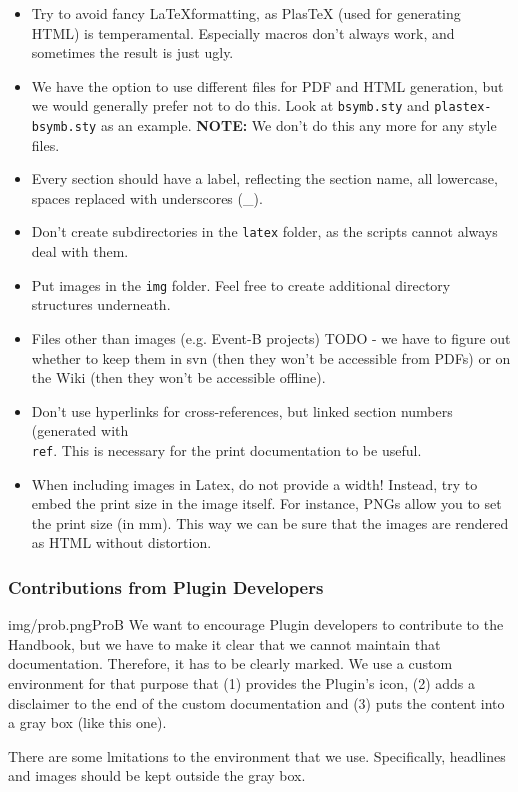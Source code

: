 \begin{itemize}
	\item Try to avoid fancy \LaTeX formatting, as PlasTeX (used for generating HTML) is temperamental.  Especially macros don't always work, and sometimes the result is just ugly.
	\item We have the option to use different files for PDF and HTML generation, but we would generally prefer not to do this.  Look at \texttt{bsymb.sty} and \texttt{plastex-bsymb.sty} as an example. \textbf{NOTE:} We don't do this any more for any style files.
	\item Every section should have a label, reflecting the section name, all lowercase, spaces replaced with underscores (\_).
	\item Don't create subdirectories in the \texttt{latex} folder, as the scripts cannot always deal with them.
	\item Put images in the \texttt{img} folder.  Feel free to create additional directory structures underneath.
	\item Files other than images (e.g. Event-B projects) TODO - we have to figure out whether to keep them in svn (then they won't be accessible from PDFs) or on the Wiki (then they won't be accessible offline).
	\item Don't use hyperlinks for cross-references, but linked section numbers (generated with \texttt{\\ref{}}.  This is necessary for the print documentation to be useful.
	\item When including images in Latex, do not provide a width!  Instead, try to embed the print size in the image itself.  For instance, PNGs allow you to set the print size (in mm).  This way we can be sure that the images are rendered as HTML without distortion.
\end{itemize}

\subsubsection{Contributions from Plugin Developers}
\label{sec:plugin_contributions}

\begin{rodin-plugin}{img/prob.png}{ProB}
We want to encourage Plugin developers to contribute to the Handbook, but we have to make it clear that we cannot maintain that documentation.  Therefore, it has to be clearly marked.  We use a custom environment for that purpose that
(1) provides the Plugin's icon, (2) adds a disclaimer to the end of the custom documentation and (3) puts the content into a gray box (like this one).

There are some lmitations to the environment that we use.  Specifically, headlines and images should be kept outside the gray box.

\end{rodin-plugin}

